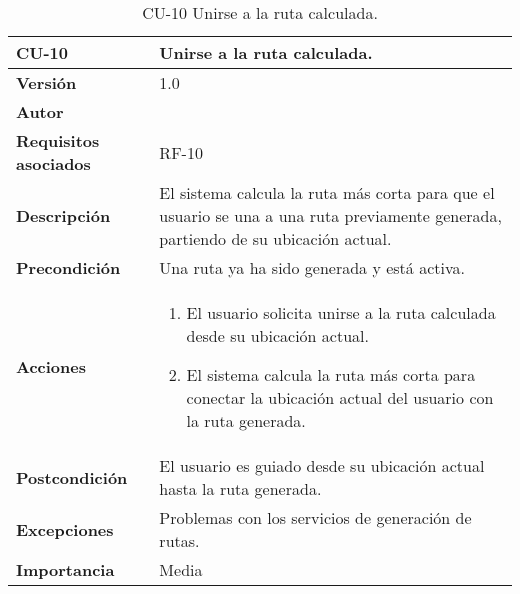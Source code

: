 \begin{table}[p]
	\centering
	\begin{tabularx}{\linewidth}{ p{} p{} }
		\toprule
		\textbf{CU-10}    & \textbf{Unirse a la ruta calculada.}\\
		\toprule
		\textbf{Versión}              & 1.0    \\
		\textbf{Autor}                & \autor \\
		\textbf{Requisitos asociados} & RF-10 \\
		\textbf{Descripción}          & El sistema calcula la ruta más corta para que el usuario se una a una ruta previamente generada, partiendo de su ubicación actual. \\
		\textbf{Precondición}         & Una ruta ya ha sido generada y está activa. \\
		\textbf{Acciones}             &
		\begin{enumerate}
			\def\labelenumi{\arabic{enumi}.}
			\tightlist
			\item El usuario solicita unirse a la ruta calculada desde su ubicación actual.
			\item El sistema calcula la ruta más corta para conectar la ubicación actual del usuario con la ruta generada.
		\end{enumerate}\\
		\textbf{Postcondición}        & El usuario es guiado desde su ubicación actual hasta la ruta generada. \\
		\textbf{Excepciones}          & Problemas con los servicios de generación de rutas. \\
		\textbf{Importancia}          & Media \\
		\bottomrule
	\end{tabularx}
	\caption{CU-10 Unirse a la ruta calculada.}
\end{table}


